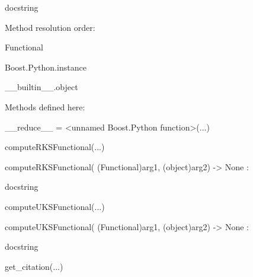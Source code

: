 \documentclass[letterpaper,10pt,english]{sphinxmanual}
\begin{document}
\begin{description}
\begin{description}
\item[{class Functional(Boost.Python.instance)}] \leavevmode
\begin{DUlineblock}{0em}
\item[] docstring
\item[] 
\item[] Method resolution order:
\item[]
\begin{DUlineblock}{\DUlineblockindent}
\item[] Functional
\item[] Boost.Python.instance
\item[] \_\_builtin\_\_.object
\item[] 
\end{DUlineblock}
\item[] Methods defined here:
\item[] 
\item[] \_\_reduce\_\_ = \textless{}unnamed Boost.Python function\textgreater{}(...)
\item[] 
\item[] computeRKSFunctional(...)
\item[]
\begin{DUlineblock}{\DUlineblockindent}
\item[] computeRKSFunctional( (Functional)arg1, (object)arg2) -\textgreater{} None :
\item[]
\begin{DUlineblock}{\DUlineblockindent}
\item[] docstring
\item[] 
\end{DUlineblock}
\end{DUlineblock}
\item[] computeUKSFunctional(...)
\item[]
\begin{DUlineblock}{\DUlineblockindent}
\item[] computeUKSFunctional( (Functional)arg1, (object)arg2) -\textgreater{} None :
\item[]
\begin{DUlineblock}{\DUlineblockindent}
\item[] docstring
\item[] 
\end{DUlineblock}
\end{DUlineblock}
\item[] get\_citation(...)
\item[]
\begin{DUlineblock}{\DUlineblockindent}

\end{DUlineblock}
\end{DUlineblock}
\end{description}
\end{description}
\end{document}
